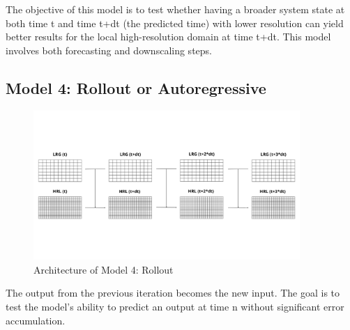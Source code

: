 The objective of this model is to test whether having a broader system state at both time t and time t+dt (the predicted time) with lower resolution can yield better results for the local high-resolution domain at time t+dt. This model involves both forecasting and downscaling steps.

\subsection{Model 4: Rollout or Autoregressive}

\begin{figure}[ht]
\centering
\includegraphics[width=0.9\textwidth]{media/model4.png}
\caption{Architecture of Model 4: Rollout}
\label{fig}
\end{figure}

The output from the previous iteration becomes the new input. The goal is to test the model's ability to predict an output at time n without significant error accumulation.